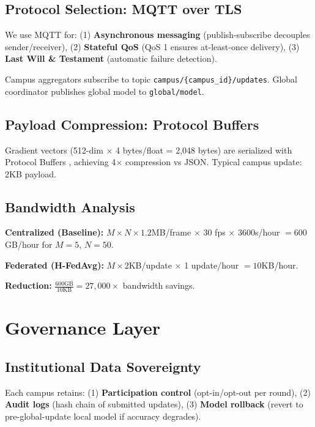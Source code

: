 \documentclass[conference]{IEEEtran}
\begin{document}
\subsection{Protocol Selection: MQTT over TLS}

We use MQTT \cite{mqtt2019} for: (1) \textbf{Asynchronous messaging} (publish-subscribe decouples sender/receiver), (2) \textbf{Stateful QoS} (QoS 1 ensures at-least-once delivery), (3) \textbf{Last Will \& Testament} (automatic failure detection).

Campus aggregators subscribe to topic \texttt{campus/\{campus\_id\}/updates}. Global coordinator publishes global model to \texttt{global/model}.

\subsection{Payload Compression: Protocol Buffers}

Gradient vectors (512-dim $\times$ 4 bytes/float = 2,048 bytes) are serialized with Protocol Buffers \cite{protobuf}, achieving 4$\times$ compression vs JSON. Typical campus update: 2KB payload.

\subsection{Bandwidth Analysis}

\textbf{Centralized (Baseline):} $M \times N \times 1.2$MB/frame $\times$ 30 fps $\times$ 3600s/hour $= 600$GB/hour for $M=5$, $N=50$.

\textbf{Federated (H-FedAvg):} $M \times 2$KB/update $\times$ 1 update/hour $= 10$KB/hour.

\textbf{Reduction:} $\frac{600\text{GB}}{10\text{KB}} = 27,000\times$ bandwidth savings.

\section{Governance Layer}

\subsection{Institutional Data Sovereignty}

Each campus retains: (1) \textbf{Participation control} (opt-in/opt-out per round), (2) \textbf{Audit logs} (hash chain of submitted updates), (3) \textbf{Model rollback} (revert to pre-global-update local model if accuracy degrades).
\end{document}
